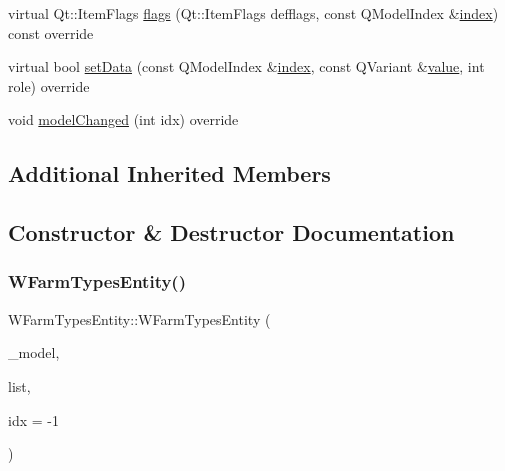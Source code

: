 \begin{DoxyCompactItemize}
\item 
virtual Qt\+::\+Item\+Flags \mbox{\hyperlink{classobjecttree_1_1_w_farm_types_entity_aa9328fe3b82e5c58eb36283051e06bff}{flags}} (Qt\+::\+Item\+Flags defflags, const Q\+Model\+Index \&\mbox{\hyperlink{classobjecttree_1_1_w_farm_types_entity_ae756759d943f0de894f9013a89019518}{index}}) const override
\item 
virtual bool \mbox{\hyperlink{classobjecttree_1_1_w_farm_types_entity_af3717238037dde2fb8c314814e17f70d}{set\+Data}} (const Q\+Model\+Index \&\mbox{\hyperlink{classobjecttree_1_1_w_farm_types_entity_ae756759d943f0de894f9013a89019518}{index}}, const Q\+Variant \&\mbox{\hyperlink{diffusion_8cpp_a4b41795815d9f3d03abfc739e666d5da}{value}}, int role) override
\item 
void \mbox{\hyperlink{classobjecttree_1_1_w_farm_types_entity_aaaf9934a880c55661e9e3bcb3443c631}{model\+Changed}} (int idx) override
\end{DoxyCompactItemize}
\subsection*{Additional Inherited Members}


\subsection{Constructor \& Destructor Documentation}
\mbox{\label{classobjecttree_1_1_w_farm_types_entity_a6111c055eedc08d09d831d1521a07dd5}} 
\subsubsection{\texorpdfstring{WFarmTypesEntity()}{WFarmTypesEntity()}}
{\footnotesize\ttfamily W\+Farm\+Types\+Entity\+::\+W\+Farm\+Types\+Entity (\begin{DoxyParamCaption}\item[{\mbox{\hyperlink{class_object_tree_model}{Object\+Tree\+Model}} $\ast$}]{\+\_\+model,  }\item[{std\+::shared\+\_\+ptr$<$ \mbox{\hyperlink{class_interesting_list_with_special_values}{Interesting\+List\+With\+Special\+Values}}$<$ int $>$$>$}]{list,  }\item[{int}]{idx = {\ttfamily -\/1} }\end{DoxyParamCaption})\hspace{0.3cm}{\ttfamily [explicit]}}




